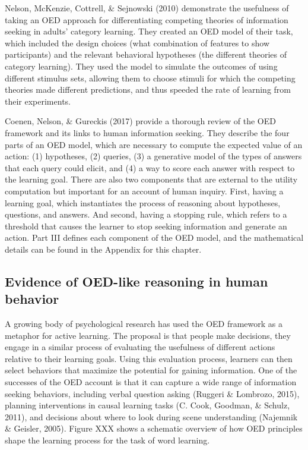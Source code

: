 \documentclass[oneside]{report}
\begin{document}
Nelson, McKenzie, Cottrell, \& Sejnowski (2010) demonstrate the
usefulness of taking an OED approach for differentiating competing
theories of information seeking in adults' category learning. They
created an OED model of their task, which included the design choices
(what combination of features to show participants) and the relevant
behavioral hypotheses (the different theories of category learning).
They used the model to simulate the outcomes of using different stimulus
sets, allowing them to choose stimuli for which the competing theories
made different predictions, and thus speeded the rate of learning from
their experiments.

Coenen, Nelson, \& Gureckis (2017) provide a thorough review of the OED
framework and its links to human information seeking. They describe the
four parts of an OED model, which are necessary to compute the expected
value of an action: (1) hypotheses, (2) queries, (3) a generative model
of the types of answers that each query could elicit, and (4) a way to
score each answer with respect to the learning goal. There are also two
components that are external to the utility computation but important
for an account of human inquiry. First, having a learning goal, which
instantiates the process of reasoning about hypotheses, questions, and
answers. And second, having a stopping rule, which refers to a threshold
that causes the learner to stop seeking information and generate an
action. Part III defines each component of the OED model, and the
mathematical details can be found in the Appendix for this chapter.

\subsection{Evidence of OED-like reasoning in human
behavior}\label{evidence-of-oed-like-reasoning-in-human-behavior}

A growing body of psychological research has used the OED framework as a
metaphor for active learning. The proposal is that people make
decisions, they engage in a similar process of evaluating the usefulness
of different actions relative to their learning goals. Using this
evaluation process, learners can then select behaviors that maximize the
potential for gaining information. One of the successes of the OED
account is that it can capture a wide range of information seeking
behaviors, including verbal question asking (Ruggeri \& Lombrozo, 2015),
planning interventions in causal learning tasks (C. Cook, Goodman, \&
Schulz, 2011), and decisions about where to look during scene
understanding (Najemnik \& Geisler, 2005). Figure XXX shows a schematic
overview of how OED principles shape the learning process for the task
of word learning.
\end{document}
